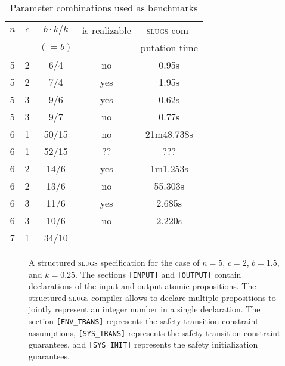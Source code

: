 \documentclass[a4paper,conference,10pt]{IEEEtran}
\begin{document}


%
\begin{table}[b]
\normalsize
\begin{center}
\begin{tabular}{c|c|c||c|c}
$n$ & $c$ & $b \cdot k/k$ & is realizable & \textsc{slugs} com- \\ & & $(=b)$& & putation time\\ \hline \hline
5 & 2 & 6/4 & no & 0.95s\\ \hline
5 & 2 & 7/4 & yes & 1.95s\\ \hline
5 & 3 & 9/6 & yes & 0.62s\\ \hline
5 & 3 & 9/7 & no & 0.77s\\ \hline
6 & 1 & 50/15 & no & 21m48.738s \\ \hline
6 & 1 & 52/15 & ?? & ??? \\ \hline
6 & 2 & 14/6 & yes & 1m1.253s \\ \hline
6 & 2 & 13/6 & no & 55.303s\\ \hline
6 & 3 & 11/6 & yes & 2.685s \\ \hline
6 & 3 & 10/6 & no & 2.220s\\ \hline
7 & 1 & 34/10 & & 
\end{tabular}
\end{center}
\caption{Parameter combinations used as benchmarks}
\label{tab:benchmarks}
\end{table}


\begin{figure}
\caption{A structured \textsc{slugs} specification for the case of $n = 5$, $c = 2$, $b = 1.5$, and $k = 0.25$. The sections \texttt{[INPUT]} and \texttt{[OUTPUT]} contain declarations of the input and output atomic propositions. The structured \textsc{slugs} compiler allows to declare multiple propositions to jointly represent an integer number in a single declaration. The section \texttt{[ENV\_TRANS]} represents the safety transition constraint assumptions, \texttt{[SYS\_TRANS]} represents the safety transition constraint guarantees, and \texttt{[SYS\_INIT]} represents the safety initialization guarantees.}
\label{fig:exampleSpec}
\end{figure}
\end{document}
